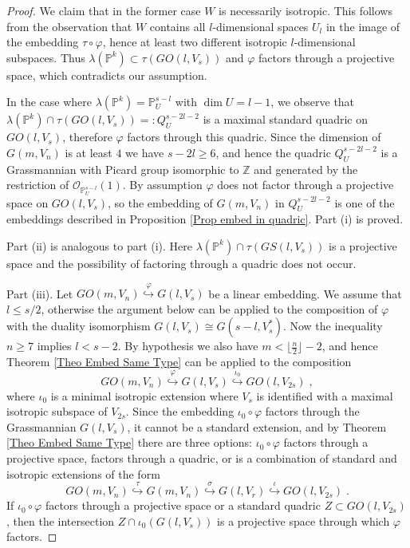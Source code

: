\documentclass[12pt]{amsart}
\def\PP {{\mathbb P}}     %
\def\ZZ {{\mathbb Z}}     %
\def\mc {\mathcal}
\begin{document}
\begin{proof}
We claim that in the former case $W$ is necessarily isotropic. This follows from the observation that $W$ contains all $l$-dimensional spaces $U_l$ in the image of the embedding $\tau\circ\varphi$, hence at least two different isotropic $l$-dimensional subspaces. Thus $\lambda(\PP^k)\subset \tau(GO(l,V_s))$ and $\varphi$ factors through a projective space, which contradicts our assumption.

In the case where $\lambda(\PP^k)=\PP_U^{s-l}$ with $\dim U=l-1$, we observe that $\lambda(\PP^k)\cap\tau(GO(l,V_s))=:Q_U^{s-2l-2}$ is a maximal standard quadric on $GO(l,V_s)$, therefore $\varphi$ factors through this quadric. Since the dimension of $G(m,V_n)$ is at least $4$ we have $s-2l\geq 6$, and hence the quadric $Q_U^{s-2l-2}$ is a Grassmannian with Picard group isomorphic to $\ZZ$ and generated by the restriction of $\mc O_{\PP_U^{s-l}}(1)$. By assumption $\varphi$ does not factor through a projective space on $GO(l,V_s)$, so the embedding of $G(m,V_n)$ in $Q_U^{s-2l-2}$ is one of the embeddings described in Proposition \ref{Prop embed in quadric}. Part (i) is proved.

Part (ii) is analogous to part (i). Here $\lambda(\PP^k)\cap \tau(GS(l,V_s))$ is a projective space and the possibility of factoring through a quadric does not occur.

Part (iii). Let $GO(m,V_n) \stackrel{\varphi}{\hookrightarrow} G(l,V_s)$ be a linear embedding. We assume that $l\leq s/2$, otherwise the argument below can be applied to the composition of $\varphi$ with the duality isomorphism $G(l,V_s)\cong G(s-l,V_s^*)$. Now the inequality $n\geq 7$ implies $l< s-2$. By hypothesis we also have $m<\lfloor\frac{n}{2}\rfloor-2$, and hence Theorem \ref{Theo Embed Same Type} can be applied to the composition
$$
GO(m,V_n) \stackrel{\varphi}{\hookrightarrow} G(l,V_s) \stackrel{\iota_0}{\hookrightarrow} GO(l,V_{2s}) \;,
$$
where $\iota_0$ is a minimal isotropic extension where $V_s$ is identified with a maximal isotropic subspace of $V_{2s}$. Since the embedding $\iota_0\circ\varphi$ factors through the Grassmannian $G(l,V_s)$, it cannot be a standard extension, and by Theorem \ref{Theo Embed Same Type} there are three options: $\iota_0\circ\varphi$ factors through a projective space, factors through a quadric, or is a combination of standard and isotropic extensions of the form
$$
GO(m,V_n) \stackrel{\tau}{\hookrightarrow} G(m,V_n) \stackrel{\sigma}{\hookrightarrow} G(l,V_r) \stackrel{\iota}{\hookrightarrow} GO(l,V_{2s}) \;.
$$
If $\iota_0\circ\varphi$ factors through a projective space or a standard quadric $Z\subset GO(l,V_{2s})$, then the intersection $Z\cap \iota_0(G(l,V_s))$ is a projective space through which $\varphi$ factors.


\end{proof}
\end{document}
